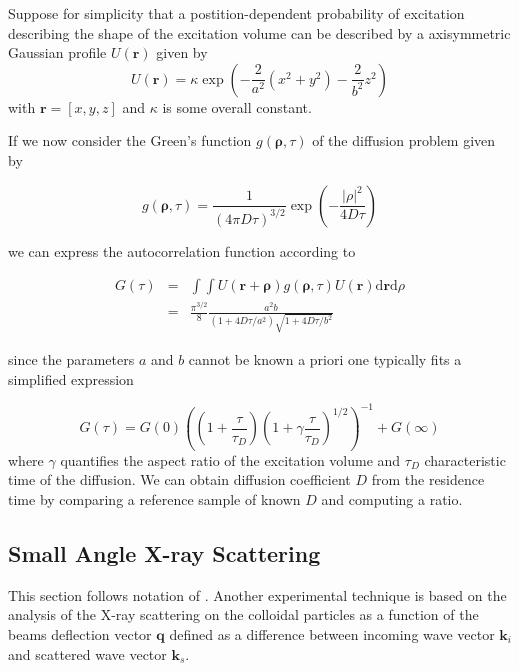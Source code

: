 \documentclass{doctoral}
\newcommand{\dd}{\mathrm{d}}
\begin{document}
Suppose for simplicity that a postition-dependent probability of excitation describing the shape of the excitation volume can be described by a axisymmetric Gaussian profile $U(\mathbf{r})$ given by
\begin{equation}
    U(\mathbf{r}) = \kappa \exp\left( - \frac{2}{a^2} \left( x^2 + y^2 \right) - \frac{2}{b^2} z^2 \right)
    \label{eqn:excitation_profile}
\end{equation}
with $\mathbf{r} = [x,y,z]$ and $\kappa$ is some overall constant.

If we now consider the Green's function $g(\mathbf{\rho},\tau)$ of the diffusion problem given by

\begin{equation}
    g(\mathbf{\rho},\tau) = \frac{1}{(4\pi D \tau)^{3/2}} \exp\left( - \frac{|\rho|^2}{4 D \tau}\right)
\end{equation}

we can express the autocorrelation function according to

\begin{eqnarray}
    G(\tau) &=& \int \int U(\mathbf{r} + \mathbf{\rho}) g(\mathbf{\rho},\tau) U(\mathbf{r}) \dd \mathbf{r} \dd \rho    \\
    &=& \frac{\pi^{3/2}}{8} \frac{a^2 b}{(1+4 D \tau / a^2)\sqrt{1+4D\tau/b^2}}
    \label{eqn:fcs_theory}
\end{eqnarray}

since the parameters $a$ and $b$ cannot be known a priori one typically fits a simplified expression

\begin{equation}
    G(\tau) = G(0) \left( \left(1+\frac{\tau}{\tau_D}\right) \left(1 + \gamma \frac{\tau}{\tau_D}\right)^{1/2} \right)^{-1} + G(\infty)
    \label{eqn:fcs-autocorrelation}
\end{equation}
where $\gamma$ quantifies the aspect ratio of the excitation volume and $\tau_D$ characteristic time of the diffusion. We can obtain diffusion coefficient $D$ from the residence time by comparing a reference sample of known $D$ and computing a ratio.

\subsection{Small Angle X-ray Scattering}

This section follows notation of \cite{Hermann_2008}. Another experimental technique is based on the analysis of the X-ray scattering on the colloidal particles as a function of the beams deflection vector $\mathbf{q}$ defined as a difference between incoming wave vector $\mathbf{k}_i$ and scattered wave vector $\mathbf{k}_s$.
\end{document}
